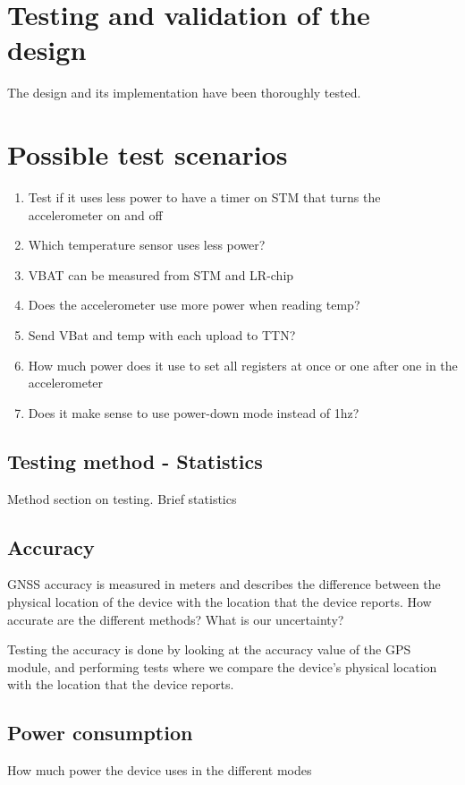 \section{Testing and validation of the design } \label{sec:testing}

The design and its implementation have been thoroughly tested.

\section{Possible test scenarios}
\begin{enumerate}
    \item Test if it uses less power to have a timer on STM that turns the accelerometer on and off
    \item Which temperature sensor uses less power?
    \item VBAT can be measured from STM and LR-chip
    \item Does the accelerometer use more power when reading temp?
    \item Send VBat and temp with each upload to TTN?
    \item How much power does it use to set all registers at once or one after one in the accelerometer
    \item Does it make sense to use power-down mode instead of 1hz?
\end{enumerate}

\subsection{Testing method - Statistics}
Method section on testing. Brief statistics

\subsection{Accuracy}
\ac{GNSS} accuracy is measured in meters and describes the difference between the physical location of the device with the location that the device reports.
How accurate are the different methods? What is our uncertainty?

Testing the accuracy is done by looking at the accuracy value of the GPS module, and performing tests where we compare the device's physical location with the location that the device reports.

\subsection{Power consumption}
How much power the device uses in the different modes

